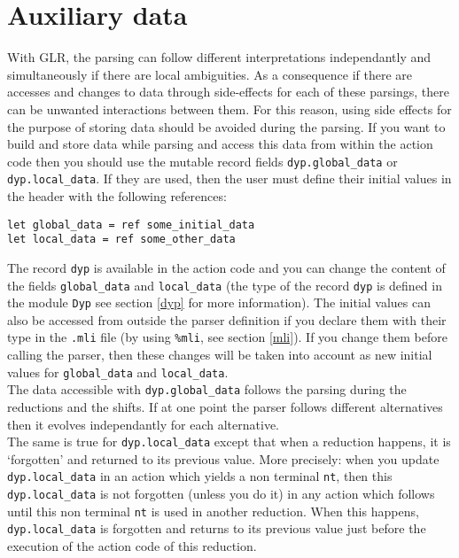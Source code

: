 \documentclass[12pt]{article}
\begin{document}
{\section{Auxiliary data}\label{data}

With GLR, the parsing can follow different interpretations independantly and simultaneously if there are local ambiguities. As a consequence if there are accesses and changes to data
through side-effects for each of these parsings, there can be unwanted
interactions between them. For this reason, using side effects for the purpose of storing data should be avoided during the parsing. If you want to build and store data while parsing and access this data from within the action code then you should use the mutable record fields \texttt{dyp.global\_data} or \texttt{dyp.local\_data}. If they are used, then the user must define their initial values in the header with the following references:
\begin{verbatim}
let global_data = ref some_initial_data
let local_data = ref some_other_data
\end{verbatim}
The record \verb|dyp| is available in the action code and you can change the content of the fields \verb|global_data| and \verb|local_data| (the type of the record \verb|dyp| is defined in the module \verb|Dyp| see section \ref{dyp} for more information). The initial values can also be accessed from outside the parser definition if you declare them with their type in the \verb|.mli| file (by using \verb|%mli|, see section \ref{mli}). If you change them before calling the parser, then these changes will be taken into account as new initial values for \verb|global_data| and \verb|local_data|.\\

The data accessible with \verb|dyp.global_data| follows the parsing during the reductions and the shifts. If at one point the parser follows different alternatives then it evolves independantly for each alternative.\\

The same is true for \texttt{dyp.local\_data} except that when a reduction happens, it is `forgotten' and returned to its previous value. More precisely: when you update \texttt{dyp.local\_data} in an action which yields a non terminal \texttt{nt}, then this \texttt{dyp.local\_data} is not forgotten (unless you do it) in any action which follows until this non terminal \texttt{nt} is used in another reduction. When this happens, \texttt{dyp.local\_data} is forgotten and returns to its previous value just before the execution of the action code of this reduction.\\

}
\end{document}

